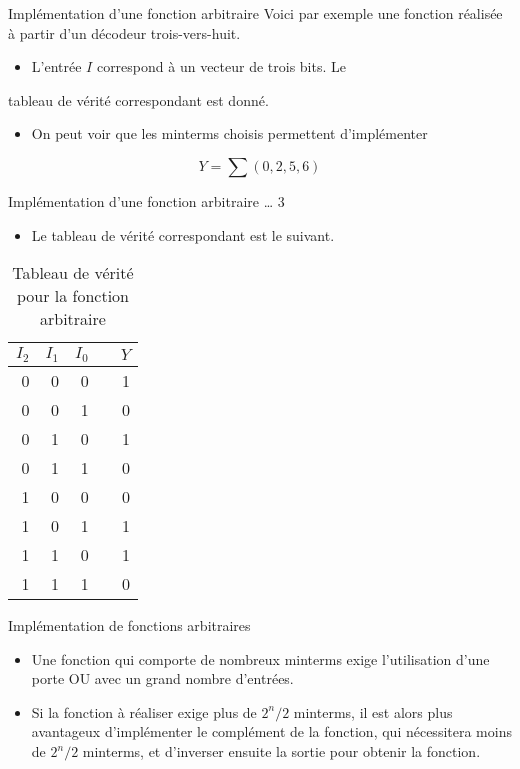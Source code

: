 \documentclass[presentation]{beamer}
\begin{document}
\begin{frame}[label={sec:org884acf1}]{Implémentation d'une fonction arbitraire}
Voici par exemple une fonction réalisée à partir d'un décodeur trois-vers-huit.
\begin{itemize}
\item L'entrée \(I\) correspond à un vecteur de trois bits. Le
\end{itemize}
tableau de vérité correspondant est donné.

\begin{itemize}
\item On peut voir que les minterms choisis permettent d'implémenter
\end{itemize}

$$ Y = \sum(0,2,5,6)$$
\end{frame}


\begin{frame}[label={sec:org2a85199}]{Implémentation d'une fonction arbitraire \ldots{} 3}
\begin{itemize}
\item Le tableau de vérité correspondant est le suivant.
\end{itemize}

\begin{table}[htbp]
\caption{\label{tab:org93215f5}Tableau de vérité pour la fonction arbitraire}
\centering
\begin{tabular}{rrrlr}
\(I_2\) & \(I_1\) & \(I_0\) &  & \(Y\)\\
\hline
0 & 0 & 0 &  & 1\\
0 & 0 & 1 &  & 0\\
0 & 1 & 0 &  & 1\\
0 & 1 & 1 &  & 0\\
1 & 0 & 0 &  & 0\\
1 & 0 & 1 &  & 1\\
1 & 1 & 0 &  & 1\\
1 & 1 & 1 &  & 0\\
\end{tabular}
\end{table}
\end{frame}

\begin{frame}[label={sec:orge3aec1b}]{Implémentation de fonctions arbitraires}
\begin{itemize}
\item Une fonction qui comporte de nombreux minterms exige l'utilisation d'une porte OU avec un grand nombre d'entrées.

\item Si la fonction à réaliser exige plus de \(2^n/2\) minterms, il est alors plus avantageux d'implémenter le complément de la fonction, qui nécessitera moins de \(2^n/2\) minterms, et d'inverser ensuite la sortie pour obtenir la fonction.
\end{itemize}
\end{frame}
\end{document}
